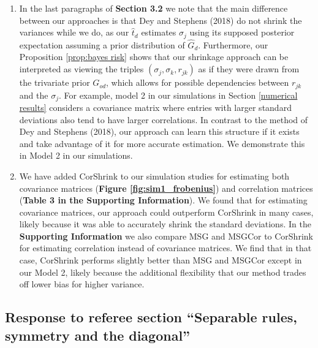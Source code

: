 \documentclass[12pt]{article}
\begin{document}
\begin{enumerate}
\item In the last paragraphs of \textbf{Section 3.2} we note that the main difference between our approaches is that Dey and Stephens (2018) do not shrink the variances while we do, as our $\hat{t}_d$ estimates $\sigma_j$ using its supposed posterior expectation assuming a prior distribution of $\hat{G}_d$. Furthermore, our Proposition \ref{prop:bayes risk} shows that our shrinkage approach can be interpreted as viewing the triples $(\sigma_j, \sigma_k, r_{jk})$ as if they were drawn from the trivariate prior $G_{od}$, which allows for possible dependencies between $r_{jk}$ and the $\sigma_j$. For example, model 2 in our simulations in Section \ref{numerical results} considers a covariance matrix where entries with larger standard deviations also tend to have larger correlations. In contrast to the method of Dey and Stephens (2018), our approach can learn this structure if it exists and take advantage of it for more accurate estimation. We demonstrate this in Model 2 in our simulations.

\item We have added CorShrink to our simulation studies for estimating both covariance matrices (\textbf{Figure \ref{fig:sim1_frobenius}}) and correlation matrices (\textbf{Table 3 in the Supporting Information}). We found that for estimating covariance matrices, our approach could outperform CorShrink in many cases, likely because it was able to accurately shrink the standard deviations. In the \textbf{Supporting Information} we also compare MSG and MSGCor to CorShrink for estimating correlation instead of covariance matrices. We find that in that case, CorShrink performs slightly better than MSG and MSGCor except in our Model 2, likely because the additional flexibility that our method trades off lower bias for higher variance.
  
\end{enumerate}

\subsection{Response to referee section ``Separable rules, symmetry and the diagonal''}
\end{document}
